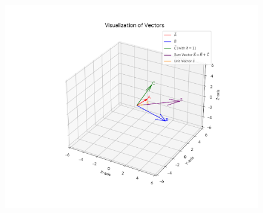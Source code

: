 \documentclass[journal]{IEEEtran}
\begin{document}
\begin{figure}[H]
    \centering
    \includegraphics[width=0.8\linewidth]{figs/graph-1.png}
    \caption{}
    \label{fig:placeholder}
\end{figure}
\end{document}
